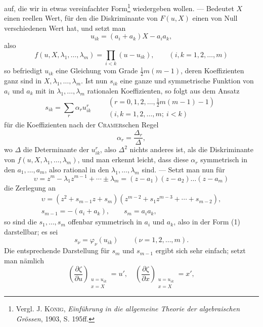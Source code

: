 auf, die wir in etwas vereinfachter Form\footnote{Vergl. J. \textsc{König}, \textit{Einführung in die allgemeine Theorie der algebraischen Grössen}, 1903, S. 195ff.} wiedergeben wollen. — Bedeutet
\(X\) einen reellen Wert, für den die Diskriminante von \(F(u,X)\) einen von Null
verschiedenen Wert hat, und setzt man
\[
u_{ik}=(a_i+a_k)X-a_ia_k,
\]
also
\[
f(u,X,\lambda_1,\ldots,\lambda_m)=\prod_{i<k}(u-u_{ik}),\qquad(i,k=1,2,\ldots,m)
\]
so befriedigt \(u_{ik}\) eine Gleichung vom Grade \(\tfrac12m(m-1)\), deren Koeffizienten
ganz sind in \(X,\lambda_1,\ldots,\lambda_m\). Ist nun \(s_{ik}\) eine ganze und symmetrische Funktion
von \(a_i\) und \(a_k\) mit in \(\lambda_1,\ldots,\lambda_m\) rationalen Koeffizienten, so folgt aus dem
Ansatz
\begingroup\makeatletter\tagsleft@true\let\veqno\leqno\makeatother
\begin{equation*}
s_{ik}=\sum_r\alpha_ru_{ik}^r\qquad
\begin{gathered}
(r=0,1,2,\ldots,\tfrac12m(m-1)-1)\\
(i,k=1,2,\ldots,m;\ i<k)
\end{gathered}\tag{1}
\end{equation*}
\endgroup
\noindent für die Koeffizienten nach der \textsc{Cramer}schen Regel
\[
\alpha_r=\frac{\Delta_r}{\Delta},
\]
wo \(\Delta\) die Determinante der \(u_{ik}^r\), also \(\Delta^2\) nichts anderes ist, als die Diskriminante
von \(f(u,X,\lambda_1,\ldots,\lambda_m)\), und man erkennt leicht, dass diese \(\alpha_r\) symmetrisch
in den \(a_1,\ldots,a_m\), also rational in den \(\lambda_1,\ldots,\lambda_m\) sind. — Setzt man nun für
\[
\upsilon=z^m-\lambda_1z^{m-1}+\cdots\pm\lambda_m=(z-a_1)(z-a_2)\ldots(z-a_m)
\]
die Zerlegung an
\[
\begin{gathered}
\upsilon=(z^2+s_{m-1}z+s_m)(z^{m-2}+s_1z^{m-3}+\cdots+s_{m-2}),\\
s_{m-1}=-(a_i+a_k),\qquad s_m=a_ia_k,
\end{gathered}
\]
\clearpage{}
\noindent so sind die \(s_1,\ldots,s_m\) offenbar symmetrisch in \(a_i\) und \(a_k\), also in der Form (1)
darstellbar; es sei
\[
s_\nu=\varphi_\nu(u_{ik})\qquad(\nu=1,2,\ldots,m).
\]
Die entsprechende Darstellung für \(s_m\) und \(s_{m-1}\) ergibt sich sehr einfach; setzt
man nämlich
\[
\left(\frac{\partial\zeta}{\partial u}\right)_{\substack{u=u_{ik}\\x=X}}=u',\quad
\left(\frac{\partial\zeta}{\partial x}\right)_{\substack{u=u_{ik}\\x=X}}=x',
\]
